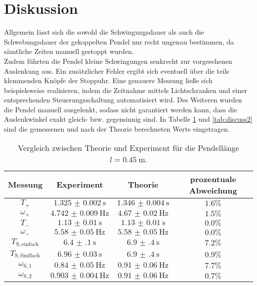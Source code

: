 \section{Diskussion}
\label{sec:Diskussion}
Allgemein lässt sich die sowohl die Schwingungsdauer als auch die Schwebungsdauer der gekoppelten Pendel nur recht ungenau bestimmen, da sämtliche Zeiten manuell gestoppt wurden.\\
Zudem führten die Pendel kleine Schwingungen senkrecht zur vorgesehenen Auslenkung aus.
Ein zusätzlicher Fehler ergibt sich eventuell über die teils klemmenden Knöpfe der Stoppuhr.
Eine genauere Messung ließe sich beispielsweise realisieren, indem die Zeitnahme mittels Lichtschranken und einer entsprechenden Steuerungsschaltung automatisiert wird.
Des Weiteren wurden die Pendel manuell ausgelenkt, sodass nicht garantiert werden kann, dass die Auslenkwinkel exakt gleich- bzw. gegensinnig sind.
In Tabelle \ref{tab:discuss} und \ref{tab:discuss2} sind die gemessenen und nach der Theorie
berechneten Werte eingetragen.

\begin{table}
	\centering
	\caption{Vergleich zwischen Theorie und Experiment für die Pendellänge $l=\SI{0.45}{\meter}$.}
	\label{tab:discuss}
	\begin{tabular}{cccc}
		\toprule
		Messung                    & Experiment               & Theorie                  & prozentuale Abweichung \\
		\midrule
		$T_{\mathrm{+}}$           & $\SI{1.325(2)}{\second}$ & $\SI{1.346(4)}{\second}$ & $1.6\%$                \\
		$\omega_{\mathrm{+}}$      & $\SI{4.742(9)}{\Hz}$     & $\SI{4.67(2)}{\Hz}$      & $1.5\%$                \\
		$T_{\mathrm{-}}$           & $\SI{1.13(1)}{\second}$  & $\SI{1.13(1)}{\second}$  & $0.0\% $               \\
		$\omega_{\mathrm{-}}$      & $\SI{5.58(5)}{\Hz}$      & $\SI{5.58(5)}{\Hz}$      & $0.0\%$                \\
		$T_{\mathrm{S,einfach}}$   & $\SI{6.4(1)}{\second}$   & $\SI{6.9(4)}{\second}$   & $7.2\%$                \\
		$T_{\mathrm{S,fünffach}}$ & $\SI{6.96(3)}{\second}$  & $\SI{6.9(4)}{\second}$   & $0.9\%$                \\
		$\omega_{\mathrm{S,1}}$    & $\SI{0.84(5)}{\Hz}$      & $\SI{0.91(6)}{\Hz}$      & $7.7\%$                \\
		$\omega_{\mathrm{S,2}}$    & $\SI{0.903(4)}{\Hz}$     & $\SI{0.91(6)}{\Hz}$      & $0.7\%$                \\
		\bottomrule
	\end{tabular}
\end{table}

